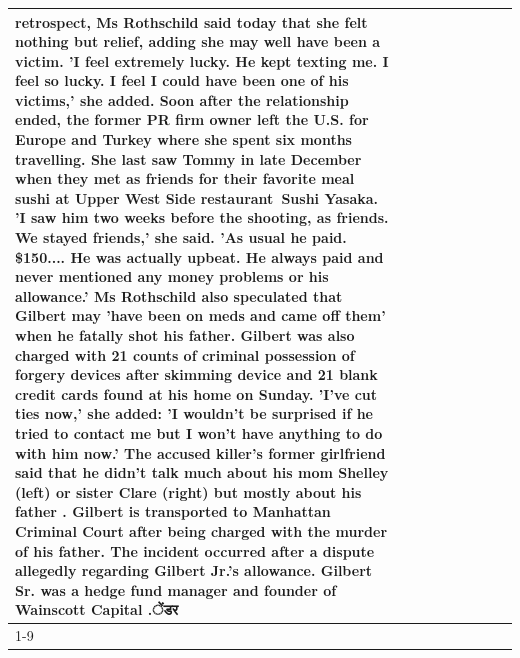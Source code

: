 \begin{table}[H]
\begin{tabular}{lllrlllll}
retrospect, Ms Rothschild said today that she felt nothing but relief, adding she may well have been a victim. 'I feel extremely lucky. He kept texting me. I feel so lucky. I feel I could have been one of his victims,' she added. Soon after the relationship ended, the former PR firm owner left the U.S. for Europe and Turkey where she spent six months  travelling. She last saw Tommy in late December when they met as friends for their favorite meal sushi at Upper West Side restaurant Sushi Yasaka. 'I saw him two weeks before the shooting, as friends. We stayed friends,' she said. 'As usual he paid. \$150.... He was actually upbeat. He always paid and never mentioned any money problems or his allowance.' Ms Rothschild also speculated that Gilbert may 'have been on meds and came off them' when he fatally shot his father. Gilbert was also charged with 21 counts of criminal possession of forgery devices after skimming device and 21 blank credit cards found at his home on Sunday. 'I've cut ties now,' she added: 'I wouldn’t be surprised if he tried to contact me but I won’t have anything to do with him now.' The accused killer's former girlfriend said that he didn't talk much about his mom Shelley (left) or sister Clare (right) but mostly about his father . Gilbert is transported to Manhattan Criminal Court  after being charged with the murder of his father. The incident occurred after a dispute allegedly regarding Gilbert Jr.'s allowance. Gilbert Sr. was a hedge fund manager and founder of Wainscott Capital .ेंडर \\
\cline{1-9} \cline{2-9}

\end{tabular}
\end{table}
